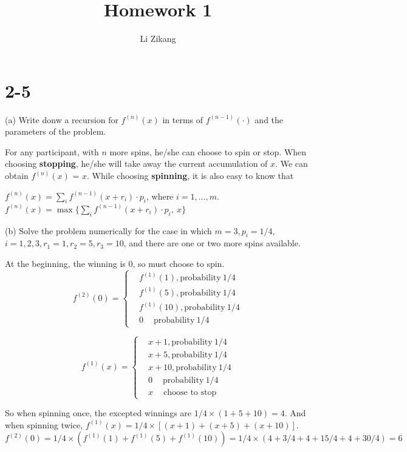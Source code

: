\documentclass[UTF8]{article}
\author {Li Zikang}
\title {Homework 1}
\date{}
\begin{document}
    \maketitle
\section*{2-5} (a) Write donw a recursion for $f^{(n)} (x)$ in terms of $f^{(n-1)} (\cdot)$ and the parameters of the problem.
    \large

    For any participant, with $n$ more spins, he/she can choose to spin or stop. When choosing \textbf{stopping}, he/she will take away the  current accumulation of $x$. We can obtain $f^{(n)} (x)$ = $x$. While choosing \textbf{spinning}, it is also easy to know that

    $ f^{(n)}(x)= \sum_{i} f^{(n-1)}(x+r_i)\cdot p_i$, where $i = 1,\ldots,m.$\\

    $ f^{(n)}(x)= \max\{\sum_{i} f^{(n-1)}(x+r_i)\cdot p_i, ~x\}$

    \normalsize
    (b) Solve the problem numerically for the case in which $m=3, p_i = 1/4$,  $i = 1,2,3, r_1 =1, r_2 =5, r_3 =10$, and there are one or two more spins available.

    \large
    At the beginning, the winning is $0$, so must choose to spin.
    $$ f^{(2)}(0)=\left\{
    \begin{aligned}
    & f^{(1)}(1), \text{probability} ~1/4 \\
    & f^{(1)}(5), \text{probability} ~1/4 \\
    & f^{(1)}(10), \text{probability} ~1/4 \\
    & 0 ~\quad \text{probability} ~1/4
    \end{aligned}
    \right.
    $$

    $$ f^{(1)}(x)=\left\{
    \begin{aligned}
    & x+1, \text{probability} ~1/4 \\
    & x+5, \text{probability} ~1/4 \\
    & x+10, \text{probability} ~1/4 \\
    & 0 ~\quad \text{probability} ~1/4 \\
    & x ~\quad \text{choose to stop}
    \end{aligned}
    \right.
    $$

So when spinning once, the excepted winnings are $1/4 \times (1+5+10)=4$. And when spinning twice, $f^{(1)}(x) = 1/4 \times [(x+1)+(x+5)+(x+10)]$. $f^{(2)}(0) =1/4 \times (f^{(1)}(1)+f^{(1)}(5)+f^{(1)}(10))= 1/4 \times (4+3/4+4+15/4+4+30/4) = 6$
\end{document}
